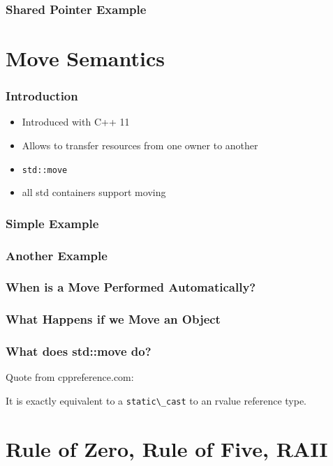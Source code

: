 \documentclass[usenames,dvipsnames,svgnames,table,aspectratio=169]{beamer}
\begin{document}
\begin{frame}
    \frametitle{Shared Pointer Example}
    
\end{frame}

\section{Move Semantics}
\begin{frame}
    \frametitle{Introduction}
    \begin{itemize}
        \item<+-> Introduced with C++ 11
        \item<+-> Allows to transfer resources from one owner to another
        \item<+-> \lstinline|std::move|
        \item<+-> all std containers support moving
    \end{itemize}
\end{frame}

\begin{frame}
    \frametitle{Simple Example}
    
\end{frame}

\begin{frame}
    \frametitle{Another Example}
    
\end{frame}

\begin{frame}
    \frametitle{When is a Move Performed Automatically?}
    
\end{frame}

\begin{frame}
    \frametitle{What Happens if we Move an Object}
    
\end{frame}

\begin{frame}
    \frametitle{What does std::move do?}
    Quote from cppreference.com:
    
    It is exactly equivalent to a \lstinline|static\_cast| to an rvalue reference type. 
    \pause
    
\end{frame}

\section{Rule of Zero, Rule of Five, RAII}
\end{document}
